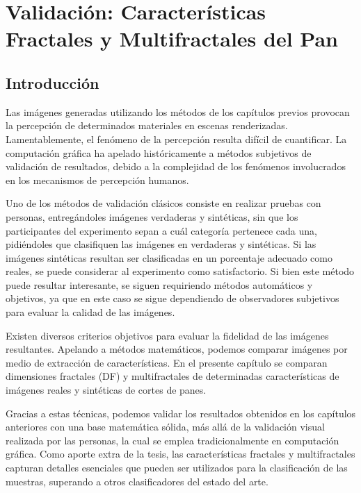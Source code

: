 \chapter[Características Fractales del Pan]{Validación: Características Fractales y Multifractales del Pan}

\section{Introducción}


Las imágenes generadas utilizando los métodos de los capítulos previos provocan la percepción de determinados materiales en escenas renderizadas.
Lamentablemente, el fenómeno de la percepción resulta difícil de cuantificar.
La computación gráfica ha apelado históricamente a métodos subjetivos de validación de resultados, debido a la complejidad de los fenómenos involucrados en los mecanismos de percepción humanos.

Uno de los métodos de validación clásicos consiste en realizar pruebas con personas, entreg\'andoles im\'agenes verdaderas y sint\'eticas, sin que los participantes del experimento sepan a cu\'al categor\'ia pertenece cada una, pidi\'endoles que clasifiquen las im\'agenes en verdaderas y sint\'eticas.
Si las im\'agenes sint\'eticas resultan ser clasificadas en un porcentaje adecuado como reales, se puede considerar al experimento como satisfactorio.
Si bien este método puede resultar interesante, se siguen requiriendo métodos automáticos y objetivos, ya que en este caso se sigue dependiendo de observadores subjetivos para evaluar la calidad de las imágenes.




Existen diversos criterios objetivos para evaluar la fidelidad de las im\'agenes resultantes.
Apelando a métodos matemáticos, podemos comparar imágenes por medio de extracci\'on de caracter\'isticas.
En el presente capítulo se comparan dimensiones fractales (\acrshort{DF}) y multifractales de determinadas caracter\'isticas de imágenes reales y sint\'eticas de cortes de panes.


Gracias a estas t\'ecnicas, podemos validar los resultados obtenidos en los cap\'itulos anteriores con una base matem\'atica s\'olida, m\'as all\'a de la validaci\'on visual realizada por las personas, la cual se emplea tradicionalmente en computaci\'on gr\'afica.
Como aporte extra de la tesis, las características fractales y multifractales capturan detalles esenciales que pueden ser utilizados para la clasificación de las muestras, superando a otros clasificadores del estado del arte.


